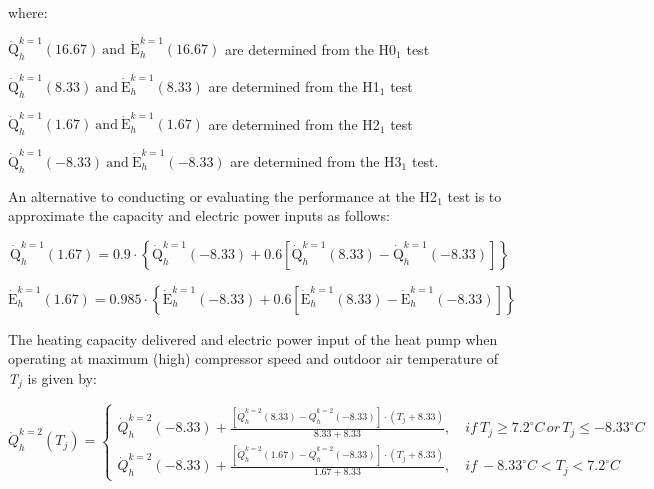 where:

\({\mathrm{\dot Q}}_h^{k = 1}\left( {{\mathrm{16}}{\mathrm{.67}}} \right){\mathrm{~and~}}\,{\mathrm{\dot E}}_h^{k = 1}\left( {{\mathrm{16}}{\mathrm{.67}}} \right)\) are determined from the H0\(_{1}\) test

\({\mathrm{\dot Q}}_h^{k = 1}\left( {{\mathrm{8}}{\mathrm{.33}}} \right) {\mathrm{~and~}} {\mathrm{\dot E}}_h^{k = 1}\left( {{\mathrm{8}}{\mathrm{.33}}} \right)\) are determined from the H1\(_{1}\) test

\({\mathrm{\dot Q}}_h^{k = 1}\left( {{\mathrm{1}}{\mathrm{.67}}} \right) {\mathrm{~and~}} {\mathrm{\dot E}}_h^{k = 1}\left( {{\mathrm{1}}{\mathrm{.67}}} \right)\) are determined from the H2\(_{1}\) test

\({\mathrm{\dot Q}}_h^{k = 1}\left( {{\mathrm{ - 8}}{\mathrm{.33}}} \right) {\mathrm{~and~}} {\mathrm{\dot E}}_h^{k = 1}\left( {{\mathrm{ - 8}}{\mathrm{.33}}} \right)\) are determined from the H3\(_{1}\) test.

An alternative to conducting or evaluating the performance at the H2\(_{1}\) test is to approximate the capacity and electric power inputs as follows:

\begin{equation}
{\mathrm{\dot Q}}_h^{k = 1}\left( {{\mathrm{1}}{\mathrm{.67}}} \right) = 0.9 \cdot \left\{ {{\mathrm{\dot Q}}_h^{k = 1}\left( {{\mathrm{ - 8}}{\mathrm{.33}}} \right) + 0.6\left[ {{\mathrm{\dot Q}}_h^{k = 1}\left( {{\mathrm{8}}{\mathrm{.33}}} \right) - {\mathrm{\dot Q}}_h^{k = 1}\left( {{\mathrm{ - 8}}{\mathrm{.33}}} \right)} \right]} \right\}
\end{equation}

\begin{equation}
{\mathrm{\dot E}}_h^{k = 1}\left( {{\mathrm{1}}{\mathrm{.67}}} \right) = 0.985 \cdot \left\{ {{\mathrm{\dot E}}_h^{k = 1}\left( {{\mathrm{ - 8}}{\mathrm{.33}}} \right) + 0.6\left[ {{\mathrm{\dot E}}_h^{k = 1}\left( {{\mathrm{8}}{\mathrm{.33}}} \right) - {\mathrm{\dot E}}_h^{k = 1}\left( {{\mathrm{ - 8}}{\mathrm{.33}}} \right)} \right]} \right\}
\end{equation}

The heating capacity delivered and electric power input of the heat pump when operating at maximum (high) compressor speed and outdoor air temperature of \emph{T\(_{j}\)} is given by:

\begin{equation}
\dot Q_h^{k = 2}({T_j}) = \left\{ \begin{array}{l}\dot Q_h^{k = 2}( - 8.33) + \frac{{\left[ {\dot Q_h^{k = 2}(8.33) - \dot Q_h^{k = 2}( - 8.33)} \right] \cdot \left( {{T_j} + 8.33} \right)}}{{8.33 + 8.33}},\quad if~{T_j} \ge 7.2^\circ C\,or\,{T_j} \le  - 8.33^\circ C\\\dot Q_h^{k = 2}( - 8.33) + \frac{{\left[ {\dot Q_h^{k = 2}(1.67) - \dot Q_h^{k = 2}( - 8.33)} \right] \cdot \left( {{T_j} + 8.33} \right)}}{{1.67 + 8.33}},\quad if~ - 8.33^\circ C < {T_j} < 7.2^\circ C\end{array} \right.
\end{equation}

